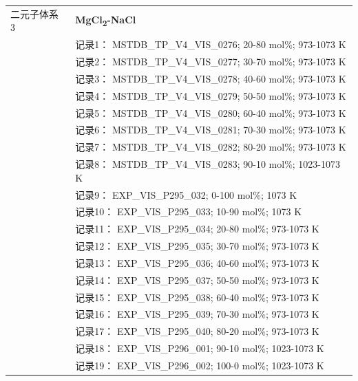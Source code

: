 \documentclass[12pt]{article}
\begin{document}
{\begin{longtable}[]{@{}
  >{\raggedright\arraybackslash}p{}
  >{\raggedright\arraybackslash}p{}@{}}
二元子体系 3  & \textbf{MgCl\textsubscript{2}-NaCl} \\
 & 记录1： MSTDB\_TP\_V4\_VIS\_0276; 20-80 mol\%; 973-1073 K \\
 & 记录2： MSTDB\_TP\_V4\_VIS\_0277; 30-70 mol\%; 973-1073 K \\
 & 记录3： MSTDB\_TP\_V4\_VIS\_0278; 40-60 mol\%; 973-1073 K \\
 & 记录4： MSTDB\_TP\_V4\_VIS\_0279; 50-50 mol\%; 973-1073 K \\
 & 记录5： MSTDB\_TP\_V4\_VIS\_0280; 60-40 mol\%; 973-1073 K \\
 & 记录6： MSTDB\_TP\_V4\_VIS\_0281; 70-30 mol\%; 973-1073 K \\
 & 记录7： MSTDB\_TP\_V4\_VIS\_0282; 80-20 mol\%; 973-1073 K \\
 & 记录8： MSTDB\_TP\_V4\_VIS\_0283; 90-10 mol\%; 1023-1073 K \\
 & 记录9： EXP\_VIS\_P295\_032; 0-100 mol\%; 1073 K \\
 & 记录10： EXP\_VIS\_P295\_033; 10-90 mol\%; 1073 K \\
 & 记录11： EXP\_VIS\_P295\_034; 20-80 mol\%; 973-1073 K \\
 & 记录12： EXP\_VIS\_P295\_035; 30-70 mol\%; 973-1073 K \\
 & 记录13： EXP\_VIS\_P295\_036; 40-60 mol\%; 973-1073 K \\
 & 记录14： EXP\_VIS\_P295\_037; 50-50 mol\%; 973-1073 K \\
 & 记录15： EXP\_VIS\_P295\_038; 60-40 mol\%; 973-1073 K \\
 & 记录16： EXP\_VIS\_P295\_039; 70-30 mol\%; 973-1073 K \\
 & 记录17： EXP\_VIS\_P295\_040; 80-20 mol\%; 973-1073 K \\
 & 记录18： EXP\_VIS\_P296\_001; 90-10 mol\%; 1023-1073 K \\
 & 记录19： EXP\_VIS\_P296\_002; 100-0 mol\%; 1023-1073 K  \\


\end{longtable}}
\end{document}
